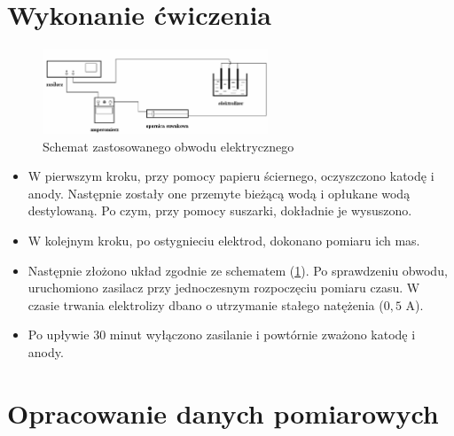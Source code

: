 \documentclass [a4paper,11pt]{article}
\begin{document}
	\section{Wykonanie ćwiczenia}
	\begin{figure}[!h]
		\centering
		\includegraphics[width=0.6\textwidth]{uklad}
		\caption{Schemat zastosowanego obwodu elektrycznego}
		\label{fig:uklad}
	\end{figure}
	\begin{itemize}
		\item W pierwszym kroku, przy pomocy papieru ściernego, oczyszczono katodę i anody. Następnie zostały one przemyte bieżącą wodą i opłukane wodą destylowaną. Po czym, przy pomocy suszarki, dokładnie je wysuszono.
		
		\item W kolejnym kroku, po ostygnieciu elektrod, dokonano pomiaru ich mas.
		
		\item Następnie złożono układ zgodnie ze schematem (\ref{fig:uklad}). Po sprawdzeniu obwodu, uruchomiono zasilacz przy jednoczesnym rozpoczęciu pomiaru czasu.
		W czasie trwania elektrolizy dbano o utrzymanie stałego natężenia ($0,5$ A).
		
		\item  Po upływie 30 minut wyłączono zasilanie i powtórnie zważono katodę i anody.
	\end{itemize}

	
	\section{Opracowanie danych pomiarowych}\label{sec:opr}
\end{document}
